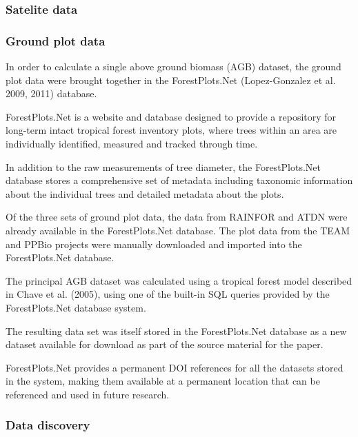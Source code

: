 \documentclass{article}
\begin{document}
\subsubsection{Satelite data}



\subsubsection{Ground plot data}

In order to calculate a single above ground biomass (AGB) dataset,
the ground plot data were brought together in the ForestPlots.Net
(Lopez-Gonzalez et al. 2009, 2011)
database.

ForestPlots.Net is a website and database designed to provide a repository for
long-term intact tropical forest inventory plots, where trees within an area are
individually identified, measured and tracked through time.

In addition to the raw measurements of tree diameter, the ForestPlots.Net database
stores a comprehensive set of metadata including taxonomic information about
the individual trees and detailed metadata about the plots.

Of the three sets of ground plot data, the data from RAINFOR and ATDN were
already available in the ForestPlots.Net database. The plot data from the TEAM
and PPBio projects were manually downloaded and imported into the
ForestPlots.Net database.

The principal AGB dataset was calculated using a tropical forest model described in Chave et al. (2005),
using one of the built-in SQL queries provided by the ForestPlots.Net database
system.

The resulting data set was itself stored in the ForestPlots.Net database as
a new dataset available for download as part of the source material for the paper.

ForestPlots.Net provides a permanent DOI references for all the datasets stored
in the system, making them available at a permanent location that can be
referenced and used in future research.

\subsubsection{Data discovery}
\end{document}
